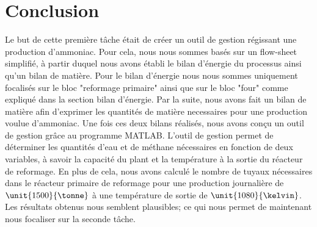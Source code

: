 \section{Conclusion}
Le but de cette première tâche était de créer un outil de gestion régissant une production d'ammoniac. 
Pour cela, nous nous sommes basés sur un flow-sheet simplifié, à partir duquel nous avons établi le bilan d'énergie du processus
ainsi qu'un bilan de matière. Pour le bilan d'énergie nous nous sommes uniquement focalisés sur le bloc "reformage primaire" ainsi
que sur le bloc "four" comme expliqué dans la section bilan d'énergie. Par la suite, nous avons fait un bilan de matière 
afin d'exprimer les quantités de matière necessaires pour une production voulue d'ammoniac. Une fois ces deux bilans 
réalisés, nous avons conçu un outil de gestion grâce au programme \textsc{MATLAB}. L'outil de gestion permet de déterminer les 
quantités d'eau et de méthane nécessaires en fonction de deux variables, à savoir la capacité du plant et la température à 
la sortie du réacteur de reformage. En plus de cela, nous avons calculé le nombre de tuyaux nécessaires dans le réacteur
primaire de reformage pour une production journalière de $\unit{1500}{\tonne}$ à une température de sortie de 
$\unit{1080}{\kelvin}$. Les résultats obtenus nous semblent plausibles; ce qui nous permet de maintenant nous focaliser sur la 
seconde tâche.
